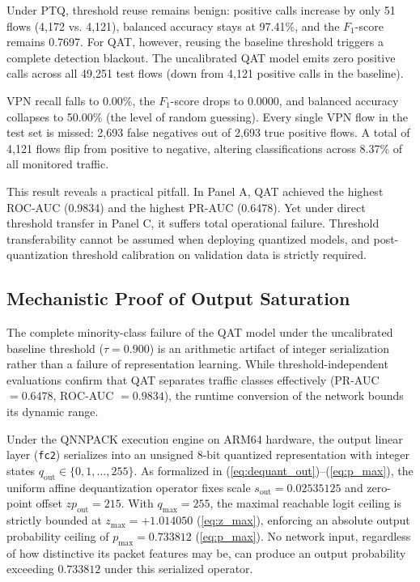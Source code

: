 \documentclass[conference]{IEEEtran}
\begin{document}
Under PTQ, threshold reuse remains benign: positive calls increase by only 51 flows (4,172 vs. 4,121), balanced accuracy stays at 97.41\%, and the $F_1$-score remains 0.7697. For QAT, however, reusing the baseline threshold triggers a complete detection blackout. The uncalibrated QAT model emits zero positive calls across all 49,251 test flows (down from 4,121 positive calls in the baseline).

VPN recall falls to 0.00\%, the $F_1$-score drops to 0.0000, and balanced accuracy collapses to 50.00\% (the level of random guessing). Every single VPN flow in the test set is missed: 2,693 false negatives out of 2,693 true positive flows. A total of 4,121 flows flip from positive to negative, altering classifications across 8.37\% of all monitored traffic.

This result reveals a practical pitfall. In Panel A, QAT achieved the highest ROC-AUC (0.9834) and the highest PR-AUC (0.6478). Yet under direct threshold transfer in Panel C, it suffers total operational failure. Threshold transferability cannot be assumed when deploying quantized models, and post-quantization threshold calibration on validation data is strictly required.

\subsection{Mechanistic Proof of Output Saturation}

The complete minority-class failure of the QAT model under the uncalibrated baseline threshold ($\tau = 0.900$) is an arithmetic artifact of integer serialization rather than a failure of representation learning. While threshold-independent evaluations confirm that QAT separates traffic classes effectively (PR-AUC $= 0.6478$, ROC-AUC $= 0.9834$), the runtime conversion of the network bounds its dynamic range.

Under the QNNPACK execution engine on ARM64 hardware, the output linear layer (\texttt{fc2}) serializes into an unsigned 8-bit quantized representation with integer states $q_{\text{out}} \in \{0, 1, \dots, 255\}$. As formalized in (\ref{eq:dequant_out})--(\ref{eq:p_max}), the uniform affine dequantization operator fixes scale $s_{\text{out}} = 0.02535125$ and zero-point offset $zp_{\text{out}} = 215$. With $q_{\max} = 255$, the maximal reachable logit ceiling is strictly bounded at $z_{\max} = +1.014050$ (\ref{eq:z_max}), enforcing an absolute output probability ceiling of $p_{\max} = 0.733812$ (\ref{eq:p_max}). No network input, regardless of how distinctive its packet features may be, can produce an output probability exceeding $0.733812$ under this serialized operator.
\end{document}
